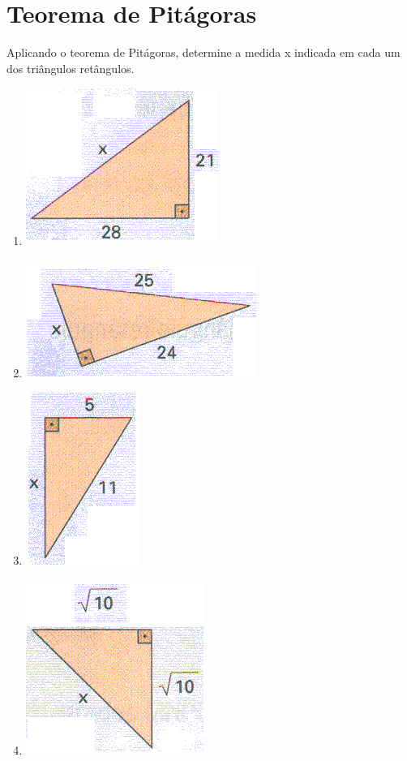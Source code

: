 \chapter{Teorema de Pitágoras}

\item Aplicando o teorema de Pitágoras, determine a medida x indicada em cada um dos triângulos retângulos.
	\begin{multicols}{2}
	\begin{enumerate}
		\item \includegraphics[scale=0.5]{figuras/fig68.png}
		\item \includegraphics[scale=0.5]{figuras/fig69.png}
		\item \includegraphics[scale=0.5]{figuras/fig70.png}
		\item \includegraphics[scale=0.5]{figuras/fig71.png}

\end{enumerate}
\end{multicols}
